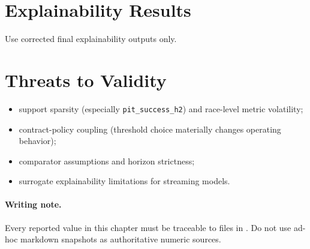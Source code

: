 
\section{Explainability Results}

Use corrected final explainability outputs only.


\section{Threats to Validity}

\begin{itemize}
    \item support sparsity (especially \texttt{pit\_success\_h2}) and race-level metric volatility;
    \item contract-policy coupling (threshold choice materially changes operating behavior);
    \item comparator assumptions and horizon strictness;
    \item surrogate explainability limitations for streaming models.
\end{itemize}

\paragraph{Writing note.}
Every reported value in this chapter must be traceable to files in . Do not use ad-hoc markdown snapshots as authoritative numeric sources.
